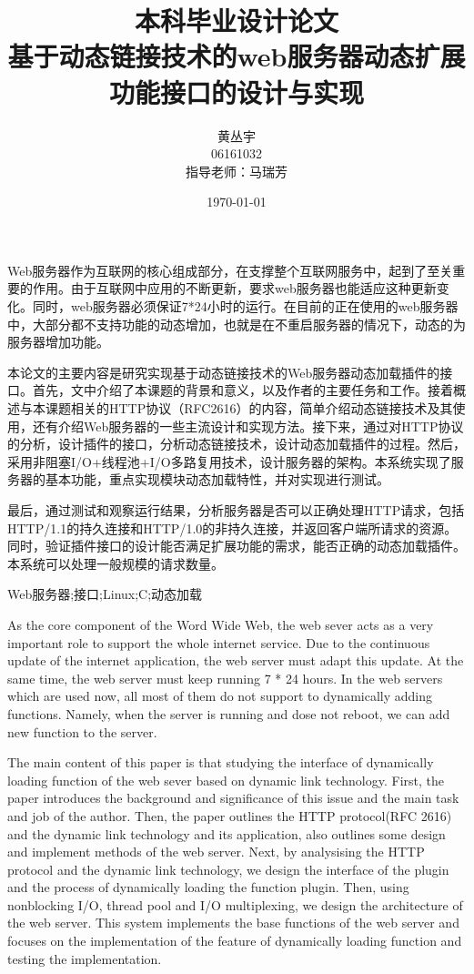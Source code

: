 \documentclass[12pt, twoside, a4paper, xetex]{report}
\begin{document}
\title{{\Huge 本科毕业设计论文\\}基于动态链接技术的web服务器动态扩展功能接口的设计与实现}
\author{黄丛宇\\06161032\\指导老师：马瑞芳}
\date{\today}

\lfour

\zhabstract 

Web服务器作为互联网的核心组成部分，在支撑整个互联网服务中，起到了至关重要的作用。由于互联网中应用的不断更新，要求web服务器也能适应这种更新变化。同时，web服务器必须保证7*24小时的运行。在目前的正在使用的web服务器中，大部分都不支持功能的动态增加，也就是在不重启服务器的情况下，动态的为服务器增加功能。

本论文的主要内容是研究实现基于动态链接技术的Web服务器动态加载插件的接口。首先，文中介绍了本课题的背景和意义，以及作者的主要任务和工作。接着概述与本课题相关的HTTP协议（RFC2616）的内容，简单介绍动态链接技术及其使用，还有介绍Web服务器的一些主流设计和实现方法。接下来，通过对HTTP协议的分析，设计插件的接口，分析动态链接技术，设计动态加载插件的过程。然后，采用非阻塞I/O+线程池+I/O多路复用技术，设计服务器的架构。本系统实现了服务器的基本功能，重点实现模块动态加载特性，并对实现进行测试。

最后，通过测试和观察运行结果，分析服务器是否可以正确处理HTTP请求，包括HTTP/1.1的持久连接和HTTP/1.0的非持久连接，并返回客户端所请求的资源。同时，验证插件接口的设计能否满足扩展功能的需求，能否正确的动态加载插件。本系统可以处理一般规模的请求数量。

{\zhkeywords Web服务器;接口;Linux;C;动态加载}

\enabstract
	As the core component of the Word Wide Web, the web sever acts as a very important role to support the whole internet service. Due to the continuous update of the internet application, the web server must adapt this update. At the same time, the web server must keep running 7 * 24 hours. In the web servers which are used now, all most of them do not support to dynamically adding functions. Namely, when the server is running and dose not reboot, we can add new function to the server. 
	
	The main content of this paper is that studying the interface of dynamically loading function of the web sever based on dynamic link technology. First, the paper introduces the background and significance of this issue and the main task and job of the author. Then, the paper outlines the HTTP protocol(RFC 2616) and the dynamic link technology and its application, also outlines some design and implement methods of the web server. Next, by analysising the HTTP protocol and the dynamic link technology, we design the interface of the plugin and the process of dynamically loading the function plugin. Then, using nonblocking I/O, thread pool and I/O multiplexing, we design the architecture of the web server. This system implements the base functions of the web server and focuses on the implementation of the feature of dynamically loading function and testing the implementation.
	
\end{document}
